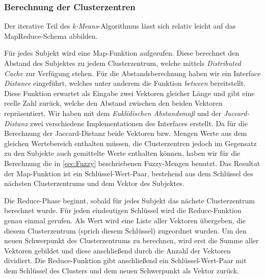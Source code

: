 \documentclass[a4paper]{llncs}
\begin{document}
\subsubsection{Berechnung der Clusterzentren}
\label{sec:BerechnungDerCluster}
Der iterative Teil des \emph{k-Means}-Algorithmus lässt sich relativ leicht auf das MapReduce-Schema abbilden.

Für jedes Subjekt wird eine Map-Funktion aufgerufen.
Diese berechnet den Abstand des Subjektes zu jedem Clusterzentrum, welche mittels \emph{Distributed Cache} zur Verfügung stehen.
Für die Abstandsberechnung haben wir ein Interface \emph{Distance} eingeführt, welches unter anderem die Funktion \emph{between} bereitstellt.
Diese Funktion erwartet als Eingabe zwei Vektoren gleicher Länge und gibt eine reelle Zahl zurück, welche den Abstand zwischen den beiden Vektoren repräsentiert.
Wir haben mit dem \emph{Euklidischen Abstandsmaß} und der \emph{Jaccard-Distanz} zwei verschiedene Implementationen des Interfaces erstellt.
Da für die Berechnung der Jaccard-Distanz beide Vektoren bzw. Mengen Werte aus dem gleichen Wertebereich enthalten müssen,
die Clusterzentren jedoch im Gegensatz zu den Subjekte auch gemittelte Werte enthalten können, haben wir für die Berechnung die in \ref{sec:Fuzzy} beschriebenen Fuzzy-Mengen benutzt.
Das Resultat der Map-Funktion ist ein Schlüssel-Wert-Paar, bestehend aus dem Schlüssel des nächsten Clusterzentrums und dem Vektor des Subjektes.

Die Reduce-Phase beginnt, sobald für jedes Subjekt das nächste Clusterzentrum berechnet wurde.
Für jeden eindeutigen Schlüssel wird die Reduce-Funktion genau einmal gerufen.
Als Wert wird eine Liste aller Vektoren übergeben, die diesem Clusterzentrum (sprich diesem Schlüssel) zugeordnet wurden. 
Um den neuen Schwerpunkt des Clusterzentrums zu berechnen,
wird erst die Summe aller Vektoren gebildet und diese anschließend durch die Anzahl der Vektoren dividiert.
Die Reduce-Funktion gibt anschließend ein Schlüssel-Wert-Paar mit dem Schlüssel des Clusters und dem neuen Schwerpunkt als Vektor zurück.
\end{document}
